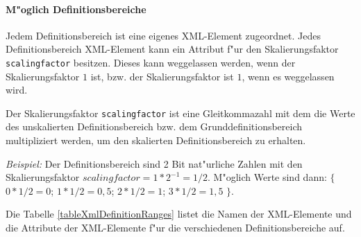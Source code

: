 \paragraph{M"oglich Definitionsbereiche}
\label{secXmlDefinitionrangesArea}

Jedem Definitionsbereich ist eine eigenes XML-Element zugeordnet. Jedes Definitionsbereich XML-Element kann ein Attribut f"ur den Skalierungsfaktor \verb|scalingfactor| besitzen. Dieses kann weggelassen werden, wenn der Skalierungsfaktor $1$ ist, bzw. der Skalierungsfaktor ist $1$, wenn es weggelassen wird.

Der Skalierungsfaktor \verb|scalingfactor| ist eine Gleitkommazahl mit dem die Werte des unskalierten Definitionsbereich bzw. dem Grunddefinitionsbereich multipliziert werden, um den skalierten Definitionsbereich zu erhalten.

\noindent
\textit{Beispiel:} Der Definitionsbereich sind 2 Bit nat"urliche Zahlen mit den Skalierungsfaktor $scalingfactor=1*2^{-1}=1/2$. M"oglich Werte sind dann: $\{$ $0*1/2=0$; $1*1/2=0,5$; $2*1/2=1$; $3*1/2=1,5$ $\}$.

\bigskip\noindent
Die Tabelle \ref{tableXmlDefinitionRanges} listet die Namen der XML-Elemente und die Attribute der XML-Elemente f"ur die verschiedenen Definitionsbereiche auf.

